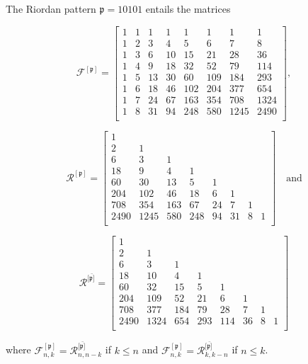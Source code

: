 \begin{example}
The Riordan pattern $\mathfrak{p}=10101$ entails the matrices

\begin{displaymath}
{\mathcal{F}^{[\mathfrak{p}]}} =
\left[\begin{array}{cccccccc}
1 & 1 & 1 & 1& 1 &  1 & 1 & 1\\
1 & 2 & 3 & 4 & 5 & 6 & 7 & 8 \\
1 & 3 & 6 & 10 & 15 & 21 & 28 & 36\\
1 & 4 & 9 & 18 & 32 & 52& 79 & 114\\
1& 5 & 13 & 30 & 60 & 109& 184 & 293\\
1 & 6 & 18 & 46 & 102 & 204 & 377 & 654\\
1 & 7 & 24 & 67 & 163 & 354& 708 & 1324\\
1 & 8 & 31 & 94 & 248 &580& 1245 &2490\\
\end{array}\right],
\end{displaymath}

\begin{displaymath}
{\mathcal{R}^{[\mathfrak{p}]}} =
\left[\begin{array}{cccccccc}
1 & & & & & & &\\
2 & 1 & & &  & & &\\
6& 3 & 1 & & & &  &\\
18 & 9 & 4 & 1 & & &  &\\
60 & 30 & 13 & 5 & 1& & & \\
204 & 102 & 46 & 18 & 6 &1 & &\\
708 & 354 & 163 & 67 & 24 & 7& 1 &\\
2490 & 1245 &  580 &248 & 94 & 31 &  8 &1\\
\end{array}\right] \quad \text{and}
\end{displaymath}

\begin{displaymath}
{\mathcal{R}^{[\bar{\mathfrak{p}]}}} = 
\left[\begin{array}{cccccccc}
1 & & & & & & &\\
2 & 1 & & &  & & &\\
6& 3 & 1 & & & &  &\\
18 & 10 & 4 & 1 & & &  &\\
60 & 32 & 15 & 5 & 1& & & \\
204 & 109 & 52 & 21 & 6 &1 & &\\
708 & 377 & 184 & 79 & 28 & 7& 1 &\\
2490 & 1324 &  654 &293 & 114 & 36 &  8 &1\\
\end{array}\right]
\end{displaymath}

where ${\mathcal{F}_{n,k}^{[\mathfrak{p}]}} = {\mathcal{R}_{n,
n-k}^{[\bar{\mathfrak{p}]}}}$ if $k\leq n$ and
${\mathcal{F}_{n,k}^{[\mathfrak{p}]}} = {\mathcal{R}_{k,
k-n}^{[\bar{\mathfrak{p}]}}}$ if $n\leq k$.


\end{example}

